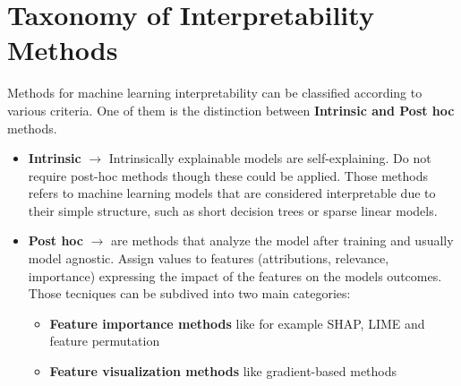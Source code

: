 \section{Taxonomy of Interpretability Methods}
Methods for machine learning interpretability can be classified according to various criteria.
One of them is the distinction between \textbf{Intrinsic and Post hoc} methods.
\begin{itemize}
    \item \textbf{Intrinsic} $\rightarrow$ Intrinsically explainable models are
    self-explaining. Do not require post-hoc methods though these could be
    applied. Those methods refers to machine learning models that are considered interpretable 
    due to their simple structure, such as short decision trees or sparse linear models.

    \item \textbf{Post hoc} $\rightarrow$ are methods that analyze the model after training and usually model agnostic.
    Assign values to features (attributions, relevance, importance) expressing the impact of the features on the models outcomes.
    Those tecniques can be subdived into two main categories:
    \begin{itemize}
        \item \textbf{Feature importance methods} like for example SHAP, LIME and feature permutation
        \item \textbf{Feature visualization methods} like gradient-based methods
    \end{itemize}
\end{itemize}

